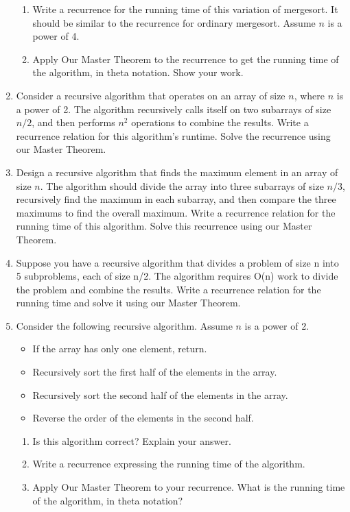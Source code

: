 \documentclass{article}
\begin{document}
\begin{enumerate}
    \begin{enumerate}
        \item Write a recurrence for the running time of this variation of mergesort. It should be similar to the recurrence for ordinary mergesort. Assume $n$ is a power of 4.
        \item Apply Our Master Theorem to the recurrence to get the running time of the algorithm, in theta notation. Show your work.
    \end{enumerate}
    \item  Consider a recursive algorithm that operates on an array of size $n$, where $n$ is a power of 2. The algorithm recursively calls itself on two subarrays of size $n/2$, and then performs $n^2$ operations to combine the results. Write a recurrence relation for this algorithm's runtime.  Solve the recurrence using our Master Theorem.

    \item  Design a recursive algorithm that finds the maximum element in an array of size $n$. The algorithm should divide the array into three subarrays of size $n/3$, recursively find the maximum in each subarray, and then compare the three maximums to find the overall maximum.  Write a recurrence relation for the running time of this algorithm. Solve this recurrence using our Master Theorem.

    \item  Suppose you have a recursive algorithm that divides a problem of size n into 5 subproblems, each of size n/2.  The algorithm requires O(n) work to divide the problem and combine the results.  Write a recurrence relation for the running time and solve it using our Master Theorem.


    \item Consider the following recursive algorithm. Assume $n$ is a power of 2.
    \begin{itemize}
        \item If the array has only one element, return.
        \item Recursively sort the first half of the elements in the array.
        \item Recursively sort the second half of the elements in the array.
        \item Reverse the order of the elements in the second half.
    \end{itemize}
    \begin{enumerate}
        \item  Is this algorithm correct? Explain your answer.
        \item Write a recurrence expressing the running time of the algorithm.
        \item Apply Our Master Theorem to your recurrence. What is the running time of the algorithm, in theta notation?
    \end{enumerate}
\end{enumerate}
\end{document}
